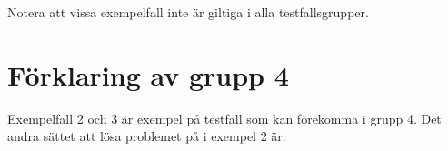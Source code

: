 Notera att vissa exempelfall inte är giltiga i alla testfallsgrupper.

\section*{Förklaring av grupp 4}
Exempelfall 2 och 3 är exempel på testfall som kan förekomma i grupp 4. Det andra sättet att lösa problemet på i exempel 2 är:

